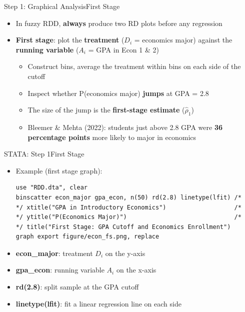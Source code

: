 \documentclass[hyperref={pdfpagelabels=false}]{beamer}
\begin{document}
\begin{frame}{Step 1: Graphical Analysis}{First Stage}
	\begin{itemize}
		\item In fuzzy RDD, \textbf{always} produce two RD plots before any regression
		\vspace{0.2cm}
		\item \textbf{First stage}: plot the \textbf{treatment} ($D_i$ = economics major)
		against the \textbf{running variable} ($A_i$ = GPA in Econ 1 \& 2)
		\vspace{0.2cm}
		\begin{itemize}
			\item Construct bins, average the treatment within bins on each side of the cutoff
			\vspace{0.2cm}
			\item Inspect whether P(economics major) \textbf{jumps} at GPA = 2.8
			\vspace{0.2cm}
			\item The size of the jump is the \textbf{first-stage estimate} ($\hat{\rho}_1$)
			\vspace{0.2cm}
			\item Bleemer \& Mehta (2022): students just above 2.8 GPA were
			\textbf{36 percentage points} more likely to major in economics
		\end{itemize}
	\end{itemize}
\end{frame}


\begin{frame}[fragile]{STATA: Step 1}{First Stage}
	\begin{itemize}
		\item Example (first stage graph):
\begin{lstlisting}
use "RDD.dta", clear
binscatter econ_major gpa_econ, n(50) rd(2.8) linetype(lfit) /*
*/ xtitle("GPA in Introductory Economics")                   /*
*/ ytitle("P(Economics Major)")                              /*
*/ title("First Stage: GPA Cutoff and Economics Enrollment")
graph export figure/econ_fs.png, replace
\end{lstlisting}
		\vspace{0.2cm}
		\item \textbf{econ\_major}: treatment $D_i$ on the y-axis
		\vspace{0.2cm}
		\item \textbf{gpa\_econ}: running variable $A_i$ on the x-axis
		\vspace{0.2cm}
		\item \textbf{rd(2.8)}: split sample at the GPA cutoff
		\vspace{0.2cm}
		\item \textbf{linetype(lfit)}: fit a linear regression line on each side
	\end{itemize}
\end{frame}
\end{document}
